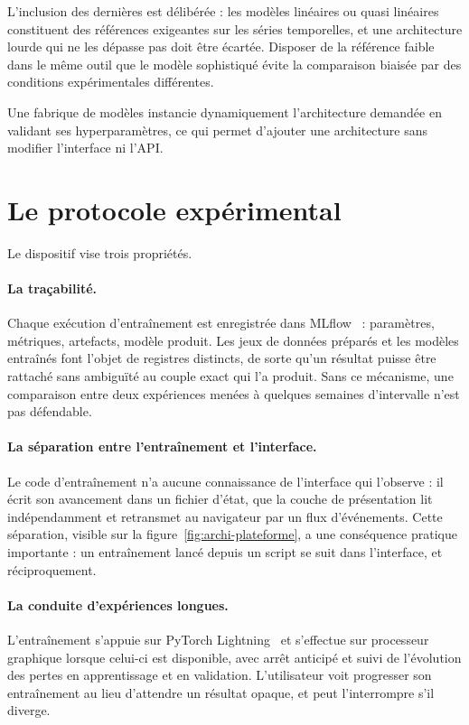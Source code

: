 L'inclusion des dernières est délibérée : les modèles linéaires ou quasi linéaires constituent
des références exigeantes sur les séries temporelles, et une architecture lourde qui ne les
dépasse pas doit être écartée. Disposer de la référence faible dans le même outil que le modèle
sophistiqué évite la comparaison biaisée par des conditions expérimentales différentes.

Une fabrique de modèles instancie dynamiquement l'architecture demandée en validant ses
hyperparamètres, ce qui permet d'ajouter une architecture sans modifier l'interface ni l'API.

\section{Le protocole expérimental}

Le dispositif vise trois propriétés.

\paragraph{La traçabilité.} Chaque exécution d'entraînement est enregistrée dans MLflow~\cite{mlflow} : paramètres, métriques, artefacts, modèle produit. Les jeux de
données préparés et les modèles entraînés font l'objet de registres distincts, de sorte qu'un
résultat puisse être rattaché sans ambiguïté au couple exact qui l'a produit. Sans ce mécanisme,
une comparaison entre deux expériences menées à quelques semaines d'intervalle n'est pas
défendable.

\paragraph{La séparation entre l'entraînement et l'interface.} Le code d'entraînement n'a aucune
connaissance de l'interface qui l'observe : il écrit son avancement dans un fichier d'état, que
la couche de présentation lit indépendamment et retransmet au navigateur par un flux
d'événements. Cette séparation, visible sur la figure~\ref{fig:archi-plateforme}, a une
conséquence pratique importante : un entraînement lancé depuis un script se suit dans
l'interface, et réciproquement.

\paragraph{La conduite d'expériences longues.} L'entraînement s'appuie sur PyTorch Lightning~\cite{pytorch_lightning} et s'effectue sur
processeur graphique lorsque celui-ci est disponible, avec arrêt anticipé et suivi de
l'évolution des pertes en apprentissage et en validation. L'utilisateur voit progresser son
entraînement au lieu d'attendre un résultat opaque, et peut l'interrompre s'il diverge.

